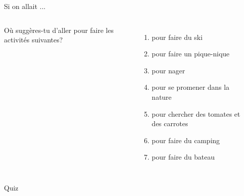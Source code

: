 \documentclass{beamer}
\begin{document}
  \begin{frame}{Si on allait ...}
    \begin{columns}
        Où suggères-tu d'aller pour faire les activités suivantes?
        \begin{enumerate}
          \item pour faire du ski
          \item<2-> pour faire un pique-nique
          \item<3-> pour nager
          \item<4-> pour se promener dans la nature
          \item<5-> pour chercher des tomates et des carrotes
          \item<6-> pour faire du camping
          \item<7-> pour faire du bateau
        \end{enumerate}
        \begin{minipage}[t][0.6\textheight]{\linewidth}
          \begin{center}
          \end{center}
        \end{minipage}
    \end{columns}
  \end{frame}

  \begin{frame}{}
    \begin{center}
      \Large Quiz
    \end{center}
  \end{frame}
\end{document}
